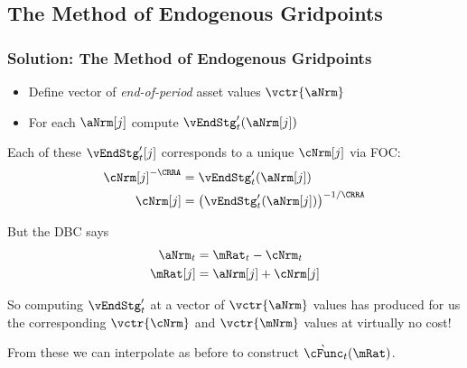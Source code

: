 \documentclass{beamer}
\begin{document}
\subsection{The Method of Endogenous Gridpoints}
\begin{frame}
\frametitle{Solution: The Method of Endogenous Gridpoints}

\pause 

\begin{itemize}
\item Define vector of {\it end-of-period} asset values $\vctr{\aNrm}$
\item For each $\aNrm[j]$ compute $\vEndStg_{t}^{\prime}(\aNrm[j])$
\end{itemize}

\pause 

Each of these $\vEndStg_{t}^{\prime}[j]$ corresponds to a unique
$\cNrm[j]$ via FOC:
\begin{equation}\begin{gathered}\begin{aligned}
  \cNrm[j]^{-\CRRA}  & = \vEndStg_{t}^{\prime}(\aNrm[j])
\\ \cNrm[j]  & = \left(\vEndStg_{t}^{\prime}(\aNrm[j])\right)^{-1/\CRRA}
\end{aligned}\end{gathered}\end{equation}

\pause 

But the DBC says
\begin{equation}\begin{gathered}\begin{aligned}
  \aNrm_{t}  & = \mRat_{t} - \cNrm_{t}
\\ \mRat[j]  & = \aNrm[j]+\cNrm[j]
\end{aligned}\end{gathered}\end{equation}

\pause 
So computing $\vEndStg_{t}^{\prime}$ at a vector of $\vctr{\aNrm}$ values has produced for us the corresponding $\vctr{\cNrm}$ and $\vctr{\mNrm}$ 
values at virtually no cost!  

\pause 
\medskip 
From these we can interpolate as before to construct $\grave{\cFunc}_{t}(\mRat)$.

\end{frame}
\end{document}
